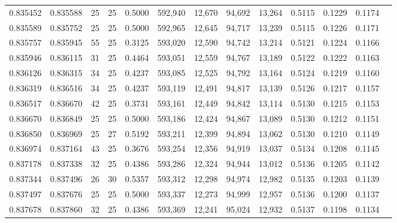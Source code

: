 \begin{tabular}{rrrrrrrrrrrrr}
0.835452 & 0.835588 &    25 &  25 &                                     0.5000 & 592,940 &  12,670 &  94,692 &  13,264 & 0.5115 & 0.1229 & 0.1174 \\
0.835589 & 0.835752 &    25 &  25 &                                     0.5000 & 592,965 &  12,645 &  94,717 &  13,239 & 0.5115 & 0.1226 & 0.1171 \\
0.835757 & 0.835945 &    55 &  25 &                                     0.3125 & 593,020 &  12,590 &  94,742 &  13,214 & 0.5121 & 0.1224 & 0.1166 \\
0.835946 & 0.836115 &    31 &  25 &                                     0.4464 & 593,051 &  12,559 &  94,767 &  13,189 & 0.5122 & 0.1222 & 0.1163 \\
0.836126 & 0.836315 &    34 &  25 &                                     0.4237 & 593,085 &  12,525 &  94,792 &  13,164 & 0.5124 & 0.1219 & 0.1160 \\
0.836319 & 0.836516 &    34 &  25 &                                     0.4237 & 593,119 &  12,491 &  94,817 &  13,139 & 0.5126 & 0.1217 & 0.1157 \\
0.836517 & 0.836670 &    42 &  25 &                                     0.3731 & 593,161 &  12,449 &  94,842 &  13,114 & 0.5130 & 0.1215 & 0.1153 \\
0.836670 & 0.836849 &    25 &  25 &                                     0.5000 & 593,186 &  12,424 &  94,867 &  13,089 & 0.5130 & 0.1212 & 0.1151 \\
0.836850 & 0.836969 &    25 &  27 &                                     0.5192 & 593,211 &  12,399 &  94,894 &  13,062 & 0.5130 & 0.1210 & 0.1149 \\
0.836974 & 0.837164 &    43 &  25 &                                     0.3676 & 593,254 &  12,356 &  94,919 &  13,037 & 0.5134 & 0.1208 & 0.1145 \\
0.837178 & 0.837338 &    32 &  25 &                                     0.4386 & 593,286 &  12,324 &  94,944 &  13,012 & 0.5136 & 0.1205 & 0.1142 \\
0.837344 & 0.837496 &    26 &  30 &                                     0.5357 & 593,312 &  12,298 &  94,974 &  12,982 & 0.5135 & 0.1203 & 0.1139 \\
0.837497 & 0.837676 &    25 &  25 &                                     0.5000 & 593,337 &  12,273 &  94,999 &  12,957 & 0.5136 & 0.1200 & 0.1137 \\
0.837678 & 0.837860 &    32 &  25 &                                     0.4386 & 593,369 &  12,241 &  95,024 &  12,932 & 0.5137 & 0.1198 & 0.1134 \\

\end{tabular}
